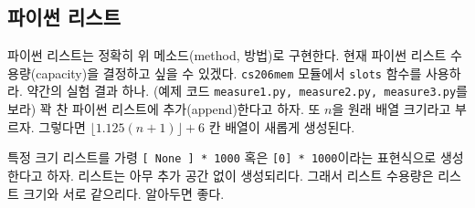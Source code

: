 \documentclass[a4paper]{oblivoir}
\begin{document}
\subsection*{파이썬 리스트}

파이썬 리스트는 정확히 위 메소드(method, 방법)로 구현한다. 현재 파이썬 리스트 수용량(capacity)을 결정하고 싶을 수 있겠다. \texttt{cs206mem} 모듈에서 \texttt{slots} 함수를 사용하라. 약간의 실험 결과 하나. (예제 코드 \texttt{measure1.py, measure2.py, measure3.py}를 보라) 꽉 찬 파이썬 리스트에 추가(append)한다고 하자. 또 $n$을 원래 배열 크기라고 부르자. 그렇다면  $\lfloor1.125(n+1)\rfloor+6$ 칸 배열이 새롭게 생성된다. 

특정 크기 리스트를 가령 \texttt{[ None ] * 1000} 혹은 \texttt{[0] * 1000}이라는 표현식으로 생성한다고 하자. 리스트는 아무 추가 공간 없이 생성되리다. 그래서 리스트 수용량은 리스트 크기와 서로 같으리다. 알아두면 좋다. 
\end{document}

